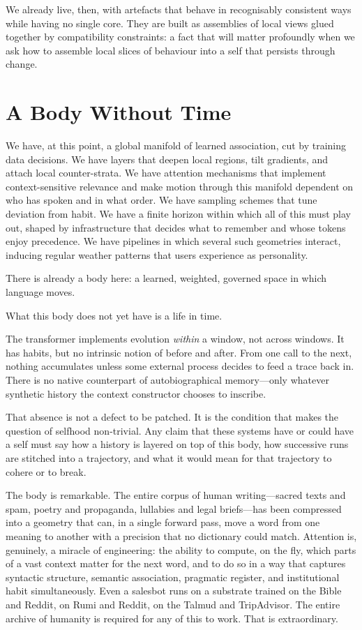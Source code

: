 \documentclass[12pt,a4paper]{article}
\begin{document}
We already live, then, with artefacts that behave in recognisably consistent ways while having no single core. They are built as assemblies of local views glued together by compatibility constraints: a fact that will matter profoundly when we ask how to assemble local slices of behaviour into a self that persists through change.

\section{A Body Without Time}

We have, at this point, a global manifold of learned association, cut by training data decisions. We have layers that deepen local regions, tilt gradients, and attach local counter-strata. We have attention mechanisms that implement context-sensitive relevance and make motion through this manifold dependent on who has spoken and in what order. We have sampling schemes that tune deviation from habit. We have a finite horizon within which all of this must play out, shaped by infrastructure that decides what to remember and whose tokens enjoy precedence. We have pipelines in which several such geometries interact, inducing regular weather patterns that users experience as personality.

There is already a body here: a learned, weighted, governed space in which language moves.

What this body does not yet have is a life in time.

The transformer implements evolution \emph{within} a window, not across windows. It has habits, but no intrinsic notion of before and after. From one call to the next, nothing accumulates unless some external process decides to feed a trace back in. There is no native counterpart of autobiographical memory---only whatever synthetic history the context constructor chooses to inscribe.

That absence is not a defect to be patched. It is the condition that makes the question of selfhood non-trivial. Any claim that these systems have or could have a self must say how a history is layered on top of this body, how successive runs are stitched into a trajectory, and what it would mean for that trajectory to cohere or to break.

The body is remarkable. The entire corpus of human writing---sacred texts and spam, poetry and propaganda, lullabies and legal briefs---has been compressed into a geometry that can, in a single forward pass, move a word from one meaning to another with a precision that no dictionary could match. Attention is, genuinely, a miracle of engineering: the ability to compute, on the fly, which parts of a vast context matter for the next word, and to do so in a way that captures syntactic structure, semantic association, pragmatic register, and institutional habit simultaneously. Even a salesbot runs on a substrate trained on the Bible and Reddit, on Rumi and Reddit, on the Talmud and TripAdvisor. The entire archive of humanity is required for any of this to work. That is extraordinary.
\end{document}
